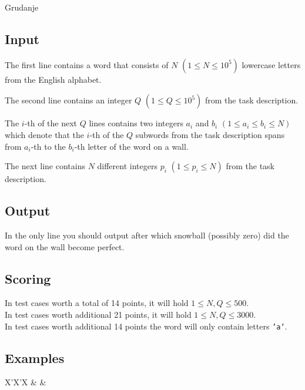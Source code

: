 \begin{statement}[
  problempoints=70,
  timelimit=2 seconds,
  memorylimit=512 MiB,
]{Grudanje}
\subsection*{Input}
The first line contains a word that consists of $N$ $(1 \le N \le 10^5)$
lowercase letters from the English alphabet.

The second line contains an integer $Q$ $(1 \le Q \le 10^5)$ from the task
description.

The $i$-th of the next $Q$ lines contains two integers $a_i$ and $b_i$
$(1 \le a_i \le b_i \le N)$ which denote that the $i$-th of the $Q$ subwords
from the task description spans from $a_i$-th to the $b_i$-th letter of the
word on a wall.

The next line contains $N$ different integers $p_i$ $(1 \le p_i \le N)$ from
the task description.

\subsection*{Output}
In the only line you should output after which snowball (possibly zero) did
the word on the wall become perfect.

\subsection*{Scoring}
In test cases worth a total of 14 points, it will hold $1 \le N, Q \le 500$. \\
In test cases worth additional 21 points, it will hold $1 \le N, Q \le 3000$. \\
In test cases worth additional 14 points the word will only contain letters
\texttt{'a'}.

\subsection*{Examples}
\begin{tabularx}{\textwidth}{X'X'X}
 &
 &
\end{tabularx}


\end{statement}
